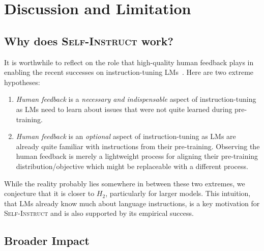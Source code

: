 \documentclass[11pt]{article}
\newcommand{\nascomment}[1]{\textcolor{blue}{\textbf{[#1 -- \textsc{nas}]}}}
\newcommand{\name}{\textsc{Self-Instruct}}
\begin{document}
\section{Discussion and Limitation}

\subsection{Why does \name{} work?}
It is worthwhile to  reflect on the role that high-quality human feedback plays 
in enabling the recent successes on instruction-tuning LMs~\cite{mishra2022cross,wang2022benchmarking,wei2022finetuned,sanh2022multitask,ouyang2022training}. 
Here are two extreme hypotheses: 

\newcommand{\subscript}[2]{$#1 _ #2$}
\begin{enumerate}[label=(\subscript{H}{{\arabic*}})]
    \item  \emph{Human feedback} is a \emph{necessary and indispensable} aspect of instruction-tuning as LMs need to learn about issues that were not quite learned during pre-training. 
    \item  \emph{Human feedback} is an \emph{optional} aspect of instruction-tuning as LMs are already quite familiar with instructions  from their pre-training. Observing the human feedback is merely a lightweight process for aligning their pre-training distribution/objective which might be replaceable with a different process. 
\end{enumerate}
While the reality probably lies somewhere in between these two extremes, we conjecture 
that it is closer to \subscript{H}{2}, particularly for larger models.
This intuition, that LMs already know much about language instructions, is a key motivation for \name{} and is also supported by its  empirical success.


\subsection{Broader Impact}
\end{document}
